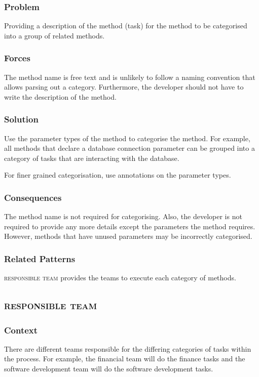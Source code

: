 \documentclass[prodmode]{style/acmlarge}
\begin{document}
\subsubsection*{Problem} Providing a description of the method (task) for the method to be
categorised into a group of related methods.

\subsubsection*{Forces} The method name is free text and is unlikely to follow a
naming convention that allows parsing out a category.  Furthermore, the
developer should not have to write the description of the method.

\subsubsection*{Solution} Use the parameter types of the method to categorise
the method.  For example, all methods that declare a database connection
parameter can be grouped into a category of tasks that are interacting with the
database.

For finer grained categorisation, use annotations on the parameter types.

\subsubsection*{Consequences} The method name is not required for categorising.
Also, the developer is not required to provide any more details except the
parameters the method requires.  However, methods that have unused parameters
may be incorrectly categorised.

\subsubsection*{Related Patterns}

\textsc{responsible team} provides the teams to execute each category of
methods.



\subsection{\textsc{\textbf{responsible team}}}

\subsubsection*{Context} There are different teams responsible for the differing
categories of tasks within the process.  For example, the financial team will do
the finance tasks and the software development team will do the software
development tasks.
\end{document}
